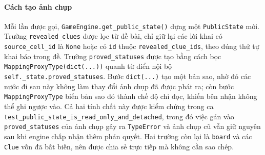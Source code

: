 \begin{sloppypar}
\paragraph{Cách tạo ảnh chụp}
Mỗi lần được gọi, \texttt{GameEngine.get\_public\_state()} dựng một
\texttt{PublicState} mới. Trường \texttt{revealed\_clues} được lọc từ đề bài,
chỉ giữ lại các lời khai có \texttt{source\_cell\_id} là \texttt{None} hoặc có
\texttt{id} thuộc \texttt{revealed\_clue\_ids}, theo đúng thứ tự khai báo trong
đề. Trường \texttt{proved\_statuses} được tạo bằng cách bọc
\texttt{MappingProxyType(dict(...))} quanh từ điển nội bộ
\texttt{self.\_state.proved\_statuses}. Bước \texttt{dict(...)} tạo một bản sao,
nhờ đó các nước đi sau này không làm thay đổi ảnh chụp đã được phát ra; còn
bước \texttt{MappingProxyType} biến bản sao đó thành chế độ chỉ đọc, khiến bên
nhận không thể ghi ngược vào. Cả hai tính chất này được kiểm chứng trong ca
\texttt{test\_public\_state\_is\_read\_only\_and\_detached}, trong đó việc gán
vào \texttt{proved\_statuses} của ảnh chụp gây ra \texttt{TypeError} và ảnh chụp
cũ vẫn giữ nguyên sau khi engine chấp nhận thêm phán quyết. Hai trường còn lại
là \texttt{board} và các \texttt{Clue} vốn đã bất biến, nên được chia sẻ trực
tiếp mà không cần sao chép.
\end{sloppypar}
